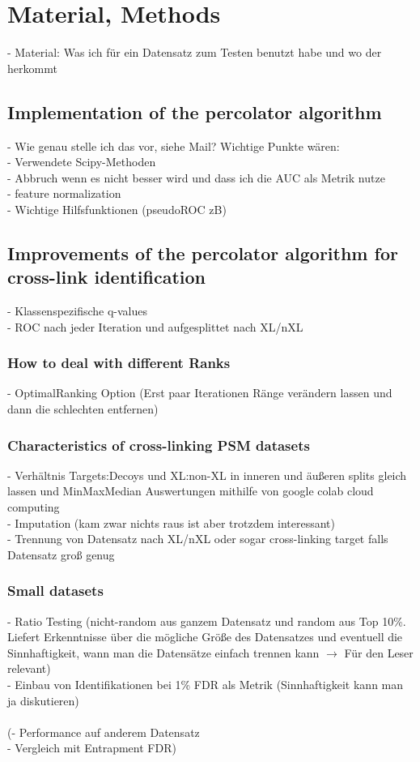 \documentclass[10pt,a4paper]{article}
\begin{document}
	\section{Material, Methods}
	
		- Material: Was ich für ein Datensatz zum Testen benutzt habe und wo der herkommt
	
		\subsection{Implementation of the percolator algorithm}
			- Wie genau stelle ich das vor, siehe Mail? Wichtige Punkte wären:\\
			- Verwendete Scipy-Methoden\\
			- Abbruch wenn es nicht besser wird und dass ich die AUC als Metrik nutze\\
			- feature normalization\\
			- Wichtige Hilfsfunktionen (pseudoROC zB)
			
		\subsection{Improvements of the percolator algorithm for cross-link identification}
			- Klassenspezifische q-values\\
			- ROC nach jeder Iteration und aufgesplittet nach XL/nXL\\
			\subsubsection{How to deal with different Ranks}
			- OptimalRanking Option (Erst paar Iterationen Ränge verändern lassen und dann die schlechten entfernen)\\
			\subsubsection{Characteristics of cross-linking PSM datasets}
			- Verhältnis Targets:Decoys und XL:non-XL in inneren und äußeren splits gleich lassen und MinMaxMedian Auswertungen mithilfe von google colab cloud computing\\
			- Imputation (kam zwar nichts raus ist aber trotzdem interessant)\\
			- Trennung von Datensatz nach XL/nXL oder sogar cross-linking target falls Datensatz groß genug\\
			\subsubsection{Small datasets}
			- Ratio Testing (nicht-random aus ganzem Datensatz und random aus Top 10\%. Liefert Erkenntnisse über die mögliche Größe des Datensatzes und eventuell die Sinnhaftigkeit, wann man die Datensätze einfach trennen kann $\rightarrow$ Für den Leser relevant)\\
			- Einbau von Identifikationen bei 1\% FDR als Metrik (Sinnhaftigkeit kann man ja diskutieren)\\\\			
			(- Performance auf anderem Datensatz\\
			- Vergleich mit Entrapment FDR)
			
\end{document}
